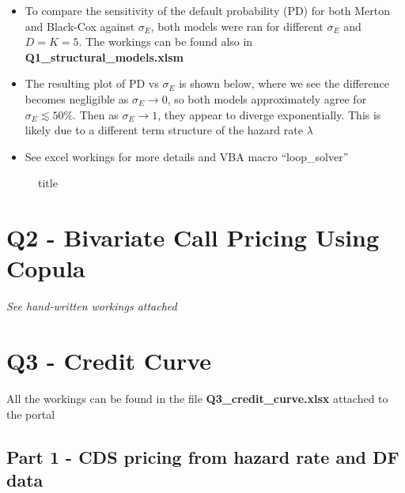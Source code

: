 \documentclass{article}
\begin{document}
\begin{itemize}
\item
  To compare the sensitivity of the default probability (PD) for both
  Merton and Black-Cox against \(\sigma_E\), both models were ran for
  different \(\sigma_E\) and \(D = K = 5\). The workings can be found
  also in \textbf{Q1\_structural\_models.xlsm}
\item
  The resulting plot of PD vs \(\sigma_E\) is shown below, where we see
  the difference becomes negligible as \(\sigma_E \to 0\), so both
  models approximately agree for \(\sigma_E \lesssim 50 \%\). Then as
  \(\sigma_E \to 1\), they appear to diverge exponentially. This is
  likely due to a different term structure of the hazard rate
  \(\lambda\)
\item
  See excel workings for more details and VBA macro ``loop\_solver''
\end{itemize}

    \begin{figure}[!htbp]
\centering
\caption{title}
\end{figure}

\newpage

    \section{Q2 - Bivariate Call Pricing Using Copula}\label{q2---credit-curve}
    
{\em \large See hand-written workings attached}

\newpage

    \section{Q3 - Credit Curve}\label{q2---credit-curve}

    All the workings can be found in the file {\bf Q3\_credit\_curve.xlsx}
attached to the portal

\subsection{Part 1 - CDS pricing from hazard rate and DF
data}\label{part-1---cds-pricing-from-hazard-rate-and-df-data}
\end{document}
